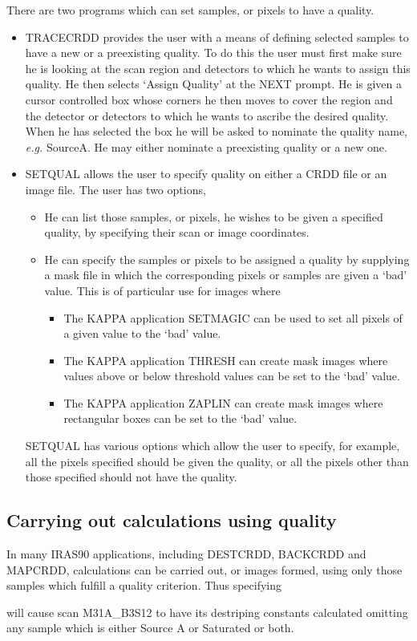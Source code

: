 \documentclass[twoside,11pt]{starlink}
\begin{document}
There are two programs which can set samples, or pixels to have a quality.
\begin{itemize}
\item TRACECRDD provides the user with a means of defining selected samples to
have a new or a preexisting quality. To do this the user must first make sure he
is looking at the scan region and detectors to which he wants to assign this
quality. He then selects `Assign Quality' at the NEXT prompt. He is given a
cursor controlled box whose corners he then moves to cover the region and the
detector or detectors to which he wants to ascribe the desired quality. When he
has selected the box he will be asked to nominate the quality name, \emph{e.g.}
 SourceA.
He may either nominate a preexisting quality or a new one.
\item SETQUAL allows the user to specify quality on either a CRDD file or an
image file. The user has two options,
\begin{itemize}
\item He can list those samples, or pixels, he wishes to be given a specified
quality, by specifying their scan or image coordinates.
\item He can specify the samples or pixels to be assigned a quality by
supplying a mask file in which the corresponding pixels or samples are given a
`bad' value. This is of particular use for images where
\begin{itemize}
\item The KAPPA application SETMAGIC can be used to set all pixels of a given
value to the `bad' value.
\item The KAPPA application THRESH can create mask images where values above or
below threshold values can be set to the `bad' value.
\item The KAPPA application ZAPLIN can create mask images where rectangular
boxes can be set to the `bad' value.
\end{itemize}
\end{itemize}
SETQUAL has various options which allow the user to specify, for example, all
the pixels specified should be given the quality, or all the pixels other than
those specified should not have the quality.
\end{itemize}
\subsection{Carrying out calculations using quality }
In many IRAS90 applications, including DESTCRDD, BACKCRDD and MAPCRDD,
calculations can be carried out, or images formed, using only those samples
which fulfill a quality criterion. Thus specifying
\begin{small}
\end{small}
will cause scan M31A\_B3S12 to have its destriping constants calculated omitting
any sample which is either Source A or Saturated or both.
\end{document}
